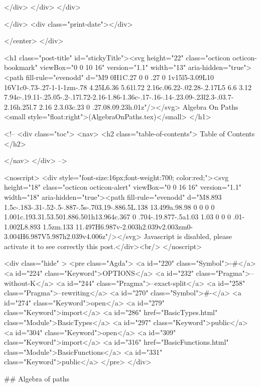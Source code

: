                 </div>
            </div>
          </div>
          
          
        </div>
        <div class="print-date"></div>
        
        
    </center>
  </div>

  

  <h1 class="post-title" id="stickyTitle"><svg height="22" class="octicon octicon-bookmark" viewBox="0 0 10 16" version="1.1" width="13" aria-hidden="true"><path fill-rule="evenodd" d="M9 0H1C.27 0 0 .27 0 1v15l5-3.09L10 16V1c0-.73-.27-1-1-1zm-.78 4.25L6.36 5.61l.72 2.16c.06.22-.02.28-.2.17L5 6.6 3.12 7.94c-.19.11-.25.05-.2-.17l.72-2.16-1.86-1.36c-.17-.16-.14-.23.09-.23l2.3-.03.7-2.16h.25l.7 2.16 2.3.03c.23 0 .27.08.09.23h.01z"/></svg> Algebra On Paths <small style="float:right">(AlgebraOnPaths.tex)</small>
  </h1>

  <!-- 
  <div class="toc">
    <nav>
    <h2 class="table-of-contents"> Table of Contents </h2>
      

    </nav>
  </div>
   -->

  <noscript>
  <div style="font-size:16px;font-weight:700; color:red;"><svg height="18" class="octicon octicon-alert" viewBox="0 0 16 16" version="1.1" width="18" aria-hidden="true"><path fill-rule="evenodd" d="M8.893 1.5c-.183-.31-.52-.5-.887-.5s-.703.19-.886.5L.138 13.499a.98.98 0 0 0 0 1.001c.193.31.53.501.886.501h13.964c.367 0 .704-.19.877-.5a1.03 1.03 0 0 0 .01-1.002L8.893 1.5zm.133 11.497H6.987v-2.003h2.039v2.003zm0-3.004H6.987V5.987h2.039v4.006z"/></svg> Javascript is disabled, please activate it to see correctly this post.</div><br/>
  </noscript>

  <div class="hide" >
<pre class="Agda">
<a id="220" class="Symbol">{-#</a> <a id="224" class="Keyword">OPTIONS</a> <a id="232" class="Pragma">--without-K</a> <a id="244" class="Pragma">--exact-split</a> <a id="258" class="Pragma">--rewriting</a> <a id="270" class="Symbol">#-}</a>
<a id="274" class="Keyword">open</a> <a id="279" class="Keyword">import</a> <a id="286" href="BasicTypes.html" class="Module">BasicTypes</a> <a id="297" class="Keyword">public</a>
<a id="304" class="Keyword">open</a> <a id="309" class="Keyword">import</a> <a id="316" href="BasicFunctions.html" class="Module">BasicFunctions</a> <a id="331" class="Keyword">public</a>
</pre>
</div>

## Algebra of paths


